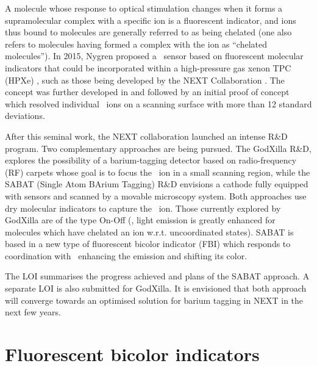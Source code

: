 \documentclass[a4paper,11pt]{article}
\begin{document}
A molecule whose response to optical stimulation changes when it forms a supramolecular complex with a specific ion is a fluorescent indicator, and ions thus bound to molecules are generally referred to as being chelated (one also refers to molecules having formed a complex with the ion as ``chelated molecules''). In 2015, Nygren proposed a \Bapp\ sensor based on fluorescent molecular indicators that could be incorporated within a high-pressure gas xenon TPC (HPXe)  \cite{Nygren_2015}, such as those being developed by the 
NEXT Collaboration \cite{Nygren:2009zz, Alvarez:2012haa, Martin-Albo:2015rhw, Gomez-Cadenas:2019sfa}. The concept  was further developed in \cite{Jones:2016qiq} and followed by an initial proof of concept \cite{McDonald:2017izm} which resolved individual \Bapp\ ions on a scanning surface \cite{McDonald:2017izm} with more than 12 standard deviations. 

After this seminal work, the NEXT collaboration launched an intense R\&D program. Two complementary approaches are being pursued. The GodXilla  R\&D, explores the possibility of a barium-tagging detector based on radio-frequency (RF) carpets whose goal is to focus the \Bapp\ ion in a small scanning region, while the SABAT (Single Atom BArium Tagging) R\&D envisions a cathode fully equipped with sensors and scanned by a movable microscopy system. Both approaches use dry molecular indicators to capture the \Bapp\ ion. Those currently explored by GodXilla are of the type On-Off (\eg, light emission is greatly enhanced for molecules which have chelated an ion  w.r.t. uncoordinated states). SABAT is based in a new type of fluorescent bicolor indicator (FBI) which responds to coordination with \Bapp\ enhancing the emission and shifting its color. 

The LOI summarises the progress achieved and plans of the SABAT approach. A separate LOI is also submitted for GodXilla. It is envisioned that both approach will converge towards an optimised solution for barium tagging in NEXT in the next few years.  


\section{Fluorescent bicolor indicators}
\end{document}
